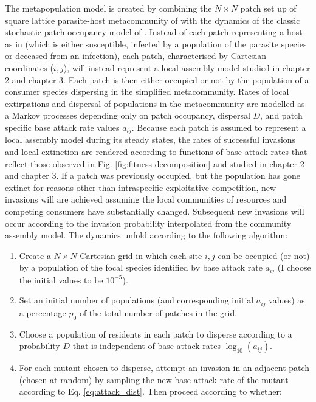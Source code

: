 \documentclass[a4paper]{report}
\DeclareMathOperator{\log}{log}
\begin{document}
{ The metapopulation model is created by combining the $N \times N $ patch set up of square lattice parasite-host metacommunity of \citep{Goodnight2008} with the dynamics of the classic stochastic patch occupancy model of \citep{Levins69:_DemographicGenetic}. Instead of each patch representing a host as in \citep{Goodnight2008} (which is either susceptible, infected by a population of the parasite species or deceased from an infection), each patch, characterised by Cartesian coordinates ($i,j$), will instead represent a local assembly model studied in chapter 2 and chapter 3. Each patch is then either occupied or not by the population of a consumer species dispersing in the simplified metacommunity. Rates of local extirpations and dispersal of populations in the metacommunity are modelled as a Markov processes depending only on patch occupancy, dispersal $D$, and patch specific base attack rate values $a_{ij}$. Because each patch is assumed to represent a local assembly model during its steady states, the rates of successful invasions and local extinction are rendered according to functions of base attack rates that reflect those observed in Fig. \ref{fig:fitness-decomposition} and studied in chapter 2 and chapter 3. If a patch was previously occupied, but the population has gone extinct for reasons other than intraspecific exploitative competition, new invasions will are achieved assuming the local communities of resources and competing consumers have substantially changed. Subsequent new invasions will occur according to the invasion probability interpolated from the community assembly model. The dynamics unfold according to the following algorithm:

\begin{enumerate}

\item Create a $N\times N$ Cartesian grid in which each site $i,j$ can be occupied (or not) by a population of the focal species identified by base attack rate $a_{ij}$ (I choose the initial values to be $10^{-5}$).

\item Set an initial number of populations (and corresponding initial $a_{ij}$ values) as a percentage $p_0$ of the total number of patches in the grid. 

\item Choose a population of residents in each patch to disperse according to a probability $D$ that is independent of base attack rates $\log_{10}(a_{ij})$. 

\item For each mutant chosen to disperse, attempt an invasion in an adjacent patch (chosen at random) by sampling the new base attack rate of the mutant according to Eq. \eqref{eq:attack_dist}. Then proceed according to whether:


\end{enumerate}}
\end{document}
